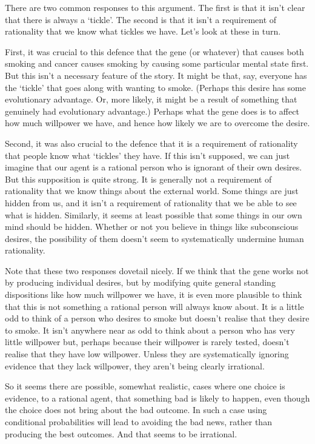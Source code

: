 There are two common responses to this argument. The first is that it isn't clear that there is always a `tickle'. The second is that it isn't a requirement of rationality that we know what tickles we have. Let's look at these in turn.

First, it was crucial to this defence that the gene (or whatever) that causes both smoking and cancer causes smoking by causing some particular mental state first. But this isn't a necessary feature of the story. It might be that, say, everyone has the `tickle' that goes along with wanting to smoke. (Perhaps this desire has some evolutionary advantage. Or, more likely, it might be a result of something that genuinely had evolutionary advantage.) Perhaps what the gene does is to affect how much willpower we have, and hence how likely we are to overcome the desire. 

Second, it was also crucial to the defence that it is a requirement of rationality that people know what `tickles' they have. If this isn't supposed, we can just imagine that our agent is a rational person who is ignorant of their own desires. But this supposition is quite strong. It is generally not a requirement of rationality that we know things about the external world. Some things are just hidden from us, and it isn't a requirement of rationality that we be able to see what is hidden. Similarly, it seems at least possible that some things in our own mind should be hidden. Whether or not you believe in things like subconscious desires, the possibility of them doesn't seem to systematically undermine human rationality.

Note that these two responses dovetail nicely. If we think that the gene works not by producing individual desires, but by modifying quite general standing dispositions like how much willpower we have, it is even more plausible to think that this is not something a rational person will always know about. It is a little odd to think of a person who desires to smoke but doesn't realise that they desire to smoke. It isn't anywhere near as odd to think about a person who has very little willpower but, perhaps because their willpower is rarely tested, doesn't realise that they have low willpower. Unless they are systematically ignoring evidence that they lack willpower, they aren't being clearly irrational.

So it seems there are possible, somewhat realistic, cases where one choice is evidence, to a rational agent, that something bad is likely to happen, even though the choice does not bring about the bad outcome. In such a case using conditional probabilities will lead to avoiding the bad news, rather than producing the best outcomes. And that seems to be irrational.